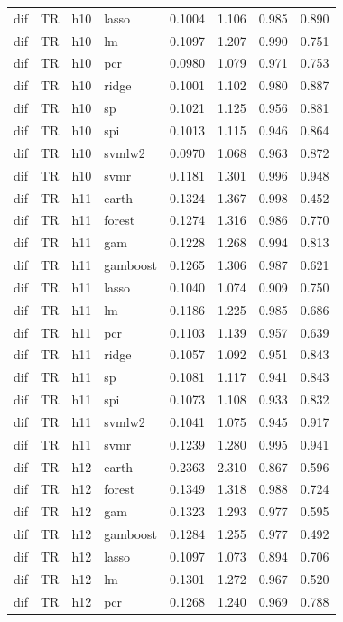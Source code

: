 \begin{ThreePartTable}
\begin{longtable}[t]{llclcccc}
dif & TR & h10 & lasso & 0.1004 & 1.106 & 0.985 & 0.890\\
dif & TR & h10 & lm & 0.1097 & 1.207 & 0.990 & 0.751\\
dif & TR & h10 & pcr & 0.0980 & 1.079 & 0.971 & 0.753\\
dif & TR & h10 & ridge & 0.1001 & 1.102 & 0.980 & 0.887\\
dif & TR & h10 & sp & 0.1021 & 1.125 & 0.956 & 0.881\\
dif & TR & h10 & spi & 0.1013 & 1.115 & 0.946 & 0.864\\
dif & TR & h10 & svmlw2 & 0.0970 & 1.068 & 0.963 & 0.872\\
dif & TR & h10 & svmr & 0.1181 & 1.301 & 0.996 & 0.948\\
\addlinespace
dif & TR & h11 & earth & 0.1324 & 1.367 & 0.998 & 0.452\\
dif & TR & h11 & forest & 0.1274 & 1.316 & 0.986 & 0.770\\
dif & TR & h11 & gam & 0.1228 & 1.268 & 0.994 & 0.813\\
dif & TR & h11 & gamboost & 0.1265 & 1.306 & 0.987 & 0.621\\
dif & TR & h11 & lasso & 0.1040 & 1.074 & 0.909 & 0.750\\
dif & TR & h11 & lm & 0.1186 & 1.225 & 0.985 & 0.686\\
dif & TR & h11 & pcr & 0.1103 & 1.139 & 0.957 & 0.639\\
dif & TR & h11 & ridge & 0.1057 & 1.092 & 0.951 & 0.843\\
dif & TR & h11 & sp & 0.1081 & 1.117 & 0.941 & 0.843\\
dif & TR & h11 & spi & 0.1073 & 1.108 & 0.933 & 0.832\\
dif & TR & h11 & svmlw2 & 0.1041 & 1.075 & 0.945 & 0.917\\
dif & TR & h11 & svmr & 0.1239 & 1.280 & 0.995 & 0.941\\
\addlinespace
dif & TR & h12 & earth & 0.2363 & 2.310 & 0.867 & 0.596\\
dif & TR & h12 & forest & 0.1349 & 1.318 & 0.988 & 0.724\\
dif & TR & h12 & gam & 0.1323 & 1.293 & 0.977 & 0.595\\
dif & TR & h12 & gamboost & 0.1284 & 1.255 & 0.977 & 0.492\\
dif & TR & h12 & lasso & 0.1097 & 1.073 & 0.894 & 0.706\\
dif & TR & h12 & lm & 0.1301 & 1.272 & 0.967 & 0.520\\
dif & TR & h12 & pcr & 0.1268 & 1.240 & 0.969 & 0.788\\

\end{longtable}
\end{ThreePartTable}
